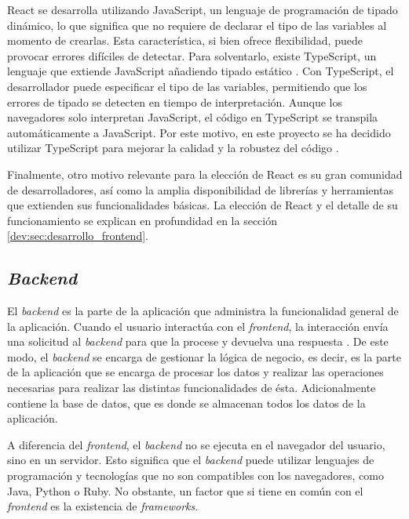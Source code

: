 React se desarrolla utilizando JavaScript, un lenguaje de programación de tipado dinámico, lo que significa que no requiere de declarar el tipo de las variables al momento de crearlas. Esta característica, si bien ofrece flexibilidad, puede provocar errores difíciles de detectar. Para solventarlo, existe TypeScript, un lenguaje que extiende JavaScript añadiendo tipado estático \cite{typescript}. Con TypeScript, el desarrollador puede especificar el tipo de las variables, permitiendo que los errores de tipado se detecten en tiempo de interpretación. Aunque los navegadores solo interpretan JavaScript, el código en TypeScript se transpila automáticamente a JavaScript. Por este motivo, en este proyecto se ha decidido utilizar TypeScript para mejorar la calidad y la robustez del código \cite{tipado}.

Finalmente, otro motivo relevante para la elección de React es su gran comunidad de desarrolladores, así como la amplia disponibilidad de librerías y herramientas que extienden sus funcionalidades básicas. La elección de React y el detalle de su funcionamiento se explican en profundidad en la sección \ref{dev:sec:desarrollo_frontend}.

\subsection{\textit{Backend}}
\label{subsec:backend}

El \textit{backend} es la parte de la aplicación que administra la funcionalidad general de la aplicación. Cuando el usuario interactúa con el \textit{frontend}, la interacción envía una solicitud al \textit{backend} para que la procese y devuelva una respuesta \cite{aws_frontend_backend}. De este modo, el \textit{backend} se encarga de gestionar la lógica de negocio, es decir, es la parte de la aplicación que se encarga de procesar los datos y realizar las operaciones necesarias para realizar las distintas funcionalidades de ésta. Adicionalmente contiene la base de datos, que es donde se almacenan todos los datos de la aplicación.

A diferencia del \textit{frontend}, el \textit{backend} no se ejecuta en el navegador del usuario, sino en un servidor. Esto significa que el \textit{backend} puede utilizar lenguajes de programación y tecnologías que no son compatibles con los navegadores, como Java, Python o Ruby. No obstante, un factor que si tiene en común con el \textit{frontend} es la existencia de \textit{frameworks}.

